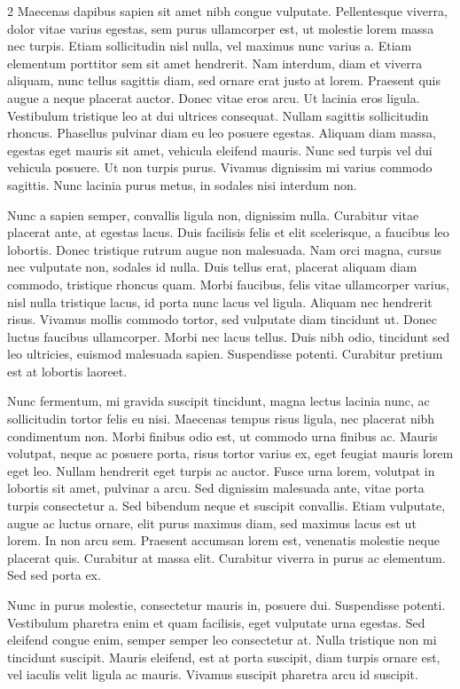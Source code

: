 \documentclass[9pt,]{book}
\begin{document}
\begin {multicols}{2}
Maecenas dapibus sapien sit amet nibh congue vulputate. Pellentesque
viverra, dolor vitae varius egestas, sem purus ullamcorper est, ut
molestie lorem massa nec turpis. Etiam sollicitudin nisl nulla, vel
maximus nunc varius a. Etiam elementum porttitor sem sit amet hendrerit.
Nam interdum, diam et viverra aliquam, nunc tellus sagittis diam, sed
ornare erat justo at lorem. Praesent quis augue a neque placerat auctor.
Donec vitae eros arcu. Ut lacinia eros ligula. Vestibulum tristique leo
at dui ultrices consequat. Nullam sagittis sollicitudin rhoncus.
Phasellus pulvinar diam eu leo posuere egestas. Aliquam diam massa,
egestas eget mauris sit amet, vehicula eleifend mauris. Nunc sed turpis
vel dui vehicula posuere. Ut non turpis purus. Vivamus dignissim mi
varius commodo sagittis. Nunc lacinia purus metus, in sodales nisi
interdum non.

Nunc a sapien semper, convallis ligula non, dignissim nulla. Curabitur
vitae placerat ante, at egestas lacus. Duis facilisis felis et elit
scelerisque, a faucibus leo lobortis. Donec tristique rutrum augue non
malesuada. Nam orci magna, cursus nec vulputate non, sodales id nulla.
Duis tellus erat, placerat aliquam diam commodo, tristique rhoncus quam.
Morbi faucibus, felis vitae ullamcorper varius, nisl nulla tristique
lacus, id porta nunc lacus vel ligula. Aliquam nec hendrerit risus.
Vivamus mollis commodo tortor, sed vulputate diam tincidunt ut. Donec
luctus faucibus ullamcorper. Morbi nec lacus tellus. Duis nibh odio,
tincidunt sed leo ultricies, euismod malesuada sapien. Suspendisse
potenti. Curabitur pretium est at lobortis laoreet.

Nunc fermentum, mi gravida suscipit tincidunt, magna lectus lacinia
nunc, ac sollicitudin tortor felis eu nisi. Maecenas tempus risus
ligula, nec placerat nibh condimentum non. Morbi finibus odio est, ut
commodo urna finibus ac. Mauris volutpat, neque ac posuere porta, risus
tortor varius ex, eget feugiat mauris lorem eget leo. Nullam hendrerit
eget turpis ac auctor. Fusce urna lorem, volutpat in lobortis sit amet,
pulvinar a arcu. Sed dignissim malesuada ante, vitae porta turpis
consectetur a. Sed bibendum neque et suscipit convallis. Etiam
vulputate, augue ac luctus ornare, elit purus maximus diam, sed maximus
lacus est ut lorem. In non arcu sem. Praesent accumsan lorem est,
venenatis molestie neque placerat quis. Curabitur at massa elit.
Curabitur viverra in purus ac elementum. Sed sed porta ex.

Nunc in purus molestie, consectetur mauris in, posuere dui. Suspendisse
potenti. Vestibulum pharetra enim et quam facilisis, eget vulputate urna
egestas. Sed eleifend congue enim, semper semper leo consectetur at.
Nulla tristique non mi tincidunt suscipit. Mauris eleifend, est at porta
suscipit, diam turpis ornare est, vel iaculis velit ligula ac mauris.
Vivamus suscipit pharetra arcu id suscipit.

\end {multicols}
\end{document}
